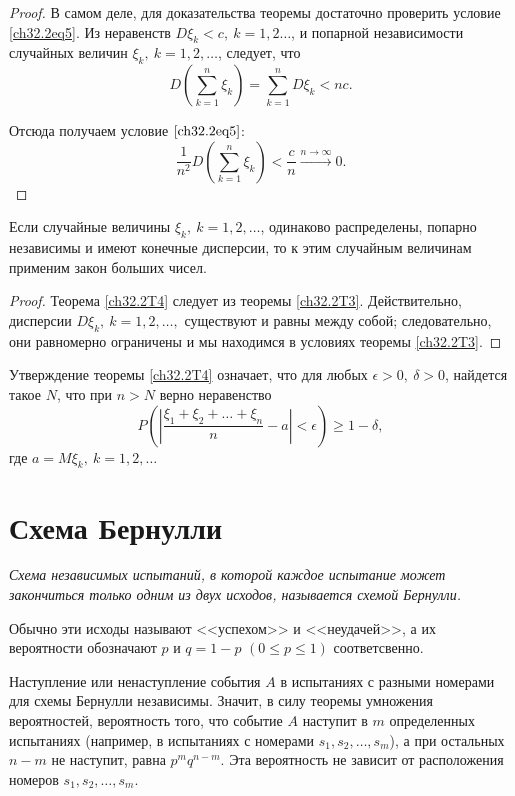 \begin{proof}
В самом деле, для доказательства теоремы достаточно проверить условие \eqref{ch32.2eq5}. Из неравенств $D  \xi_k < c, \: k = 1, 2\ldots$, и попарной независимости случайных величин $\xi_k, \: k = 1,2,\ldots$, следует, что
$$
D  \left( \sum_{k  = 1}^{n} \xi_k\right) = \sum_{k  = 1}^{n} D  \xi_k  < nc.
$$

Отсюда получаем условие $\eqref{ch32.2eq5}$:
\begin{equation*}
\frac{1}{n^2} D  \left( \sum_{k  = 1}^{n} \xi_k\right) < \frac{c}{n} \xrightarrow{n \to \infty} 0. \tag*{\qedhere}
\end{equation*}
\end{proof}

\begin{thm} \label{ch32.2T4}
Если случайные величины $\xi_k, \: k = 1,2,\ldots$, одинаково распределены, попарно независимы и имеют конечные дисперсии, то к этим случайным величинам применим закон больших чисел.
\end{thm}
\begin{proof}
Теорема \ref{ch32.2T4} следует из теоремы \ref{ch32.2T3}. Действительно, дисперсии $D\xi_k, \: k = 1,2, \ldots,$ существуют и равны между собой; следовательно, они равномерно ограничены и мы находимся в условиях теоремы \ref{ch32.2T3}.
\end{proof}
Утверждение теоремы \ref{ch32.2T4} означает, что для любых $\epsilon > 0, \: \delta > 0$, найдется такое $N$, что при $n > N$ верно неравенство
\begin{equation} \label{ch32.2eq6}
P \left( \left| \frac{\xi_1 + \xi_2 + \ldots + \xi_n}{n} - a \right| < \epsilon \right) \ge 1 - \delta,
\end{equation}
где $a = M  \xi_k, \: k = 1, 2, \ldots$

\section{Схема Бернулли}

\textit{Схема независимых испытаний, в которой каждое испытание может закончиться только одним из двух исходов, называется схемой Бернулли.}

Обычно эти исходы называют <<успехом>> и <<неудачей>>, а их вероятности обозначают $p$ и $q = 1 - p$ $(0 \le p \le 1)$ соответсвенно.

Наступление или ненаступление события $A$ в испытаниях с разными номерами для схемы Бернулли независимы. Значит, в силу теоремы умножения вероятностей, вероятность того, что событие $A$ наступит в $m$ определенных испытаниях (например, в испытаниях с номерами $s_1, s_2, \ldots, s_m$), а при остальных $n - m$ не наступит, равна $p^mq^{n - m}$. Эта вероятность не зависит от  расположения номеров $s_1, s_2, \ldots, s_m$.

